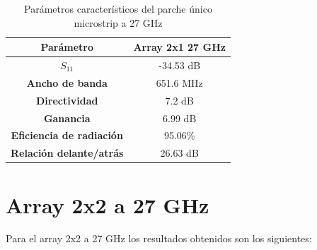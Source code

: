\begin{table}[H]
  
  
   \small %
   \centering %
   \begin{tabular}{c c} %
   \toprule[\heavyrulewidth]\toprule[\heavyrulewidth]
   \textbf{Parámetro} & \textbf{Array 2x1 27 GHz} \\ 
   \midrule
   \textbf{$S_{11}$} & -34.53 dB \\
   \textbf{Ancho de banda} & 651.6 MHz \\
   \textbf{Directividad} & 7.2 dB \\
   \textbf{Ganancia} & 6.99 dB \\
   \textbf{Eficiencia de radiación} & 95.06\% \\
   \textbf{Relación delante/atrás} & 26.63 dB \\

   \bottomrule[\heavyrulewidth] 
   \end{tabular}
   \caption{Parámetros característicos del parche único microstrip a 27 GHz} 
    \label{tab:res2x13}
\end{table}





























\section{Array 2x2 a 27 GHz}
\par Para el array 2x2 a 27 GHz los resultados obtenidos son los siguientes:


